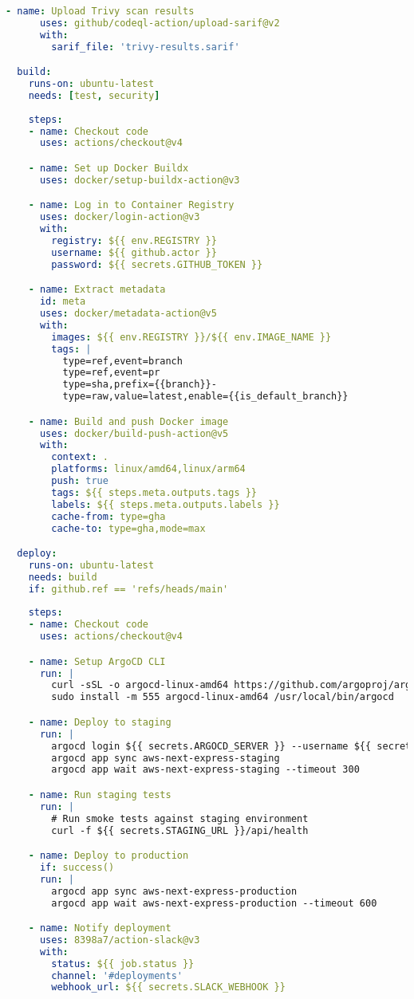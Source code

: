 \begin{lstlisting}[language=YAML, caption=.github/workflows/ci-cd.yml]
    - name: Upload Trivy scan results
      uses: github/codeql-action/upload-sarif@v2
      with:
        sarif_file: 'trivy-results.sarif'

  build:
    runs-on: ubuntu-latest
    needs: [test, security]
    
    steps:
    - name: Checkout code
      uses: actions/checkout@v4

    - name: Set up Docker Buildx
      uses: docker/setup-buildx-action@v3

    - name: Log in to Container Registry
      uses: docker/login-action@v3
      with:
        registry: ${{ env.REGISTRY }}
        username: ${{ github.actor }}
        password: ${{ secrets.GITHUB_TOKEN }}

    - name: Extract metadata
      id: meta
      uses: docker/metadata-action@v5
      with:
        images: ${{ env.REGISTRY }}/${{ env.IMAGE_NAME }}
        tags: |
          type=ref,event=branch
          type=ref,event=pr
          type=sha,prefix={{branch}}-
          type=raw,value=latest,enable={{is_default_branch}}

    - name: Build and push Docker image
      uses: docker/build-push-action@v5
      with:
        context: .
        platforms: linux/amd64,linux/arm64
        push: true
        tags: ${{ steps.meta.outputs.tags }}
        labels: ${{ steps.meta.outputs.labels }}
        cache-from: type=gha
        cache-to: type=gha,mode=max

  deploy:
    runs-on: ubuntu-latest
    needs: build
    if: github.ref == 'refs/heads/main'
    
    steps:
    - name: Checkout code
      uses: actions/checkout@v4

    - name: Setup ArgoCD CLI
      run: |
        curl -sSL -o argocd-linux-amd64 https://github.com/argoproj/argo-cd/releases/latest/download/argocd-linux-amd64
        sudo install -m 555 argocd-linux-amd64 /usr/local/bin/argocd

    - name: Deploy to staging
      run: |
        argocd login ${{ secrets.ARGOCD_SERVER }} --username ${{ secrets.ARGOCD_USERNAME }} --password ${{ secrets.ARGOCD_PASSWORD }} --insecure
        argocd app sync aws-next-express-staging
        argocd app wait aws-next-express-staging --timeout 300

    - name: Run staging tests
      run: |
        # Run smoke tests against staging environment
        curl -f ${{ secrets.STAGING_URL }}/api/health

    - name: Deploy to production
      if: success()
      run: |
        argocd app sync aws-next-express-production
        argocd app wait aws-next-express-production --timeout 600

    - name: Notify deployment
      uses: 8398a7/action-slack@v3
      with:
        status: ${{ job.status }}
        channel: '#deployments'
        webhook_url: ${{ secrets.SLACK_WEBHOOK }}
\end{lstlisting}

